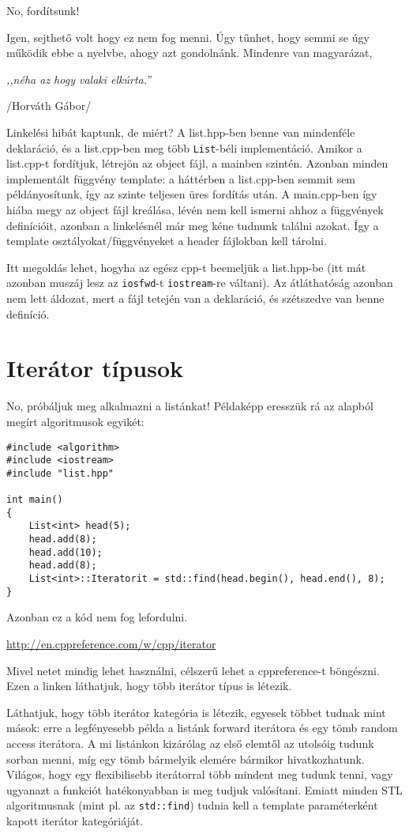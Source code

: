 \documentclass[a4paper,11.5pt]{article}
\begin{document}
	\medskip
	No, fordítsunk!
	
	\medskip
	Igen, sejthető volt hogy ez nem fog menni. Úgy tűnhet, hogy semmi se úgy működik ebbe a nyelvbe, ahogy azt gondolnánk. Mindenre van magyarázat,
	\begin{center}
		\textit{,,néha az hogy valaki elkúrta.''}
		
		/Horváth Gábor/
	\end{center}
	Linkelési hibát kaptunk, de miért? A list.hpp-ben benne van mindenféle deklaráció, és a list.cpp-ben meg több \texttt{List}-béli implementáció. Amikor a list.cpp-t fordítjuk, létrejön az object fájl, a mainben szintén. Azonban minden implementált függvény template: a háttérben a list.cpp-ben semmit sem példányosítunk, így az szinte teljesen üres fordítás után. A main.cpp-ben így hiába megy az object fájl kreálása, lévén nem kell ismerni ahhoz a függvények definícióit, azonban a linkelésnél már meg kéne tudnunk találni azokat. Így a template osztályokat/függvényeket a header fájlokban kell tárolni.
	
	Itt megoldás lehet, hogyha az egész cpp-t beemeljük a list.hpp-be (itt mát azonban muszáj lesz az \texttt{iosfwd}-t \texttt{iostream}-re váltani). Az átláthatóság azonban nem lett áldozat, mert a fájl tetején van a deklaráció, és szétszedve van benne definíció.
	\section{Iterátor típusok}
	No, próbáljuk meg alkalmazni a listánkat! Példaképp eresszük rá az alapból megírt algoritmusok egyikét:
\begin{lstlisting}
#include <algorithm>
#include <iostream>
#include "list.hpp"

int main()
{
	List<int> head(5);
	head.add(8);
	head.add(10);
	head.add(8);
	List<int>::Iteratorit = std::find(head.begin(), head.end(), 8);
}
\end{lstlisting}
	Azonban ez a kód nem fog lefordulni.
	
	\url{http://en.cppreference.com/w/cpp/iterator}
	
	Mivel netet mindig lehet használni, célszerű lehet a cppreference-t böngészni. Ezen a linken láthatjuk, hogy több iterátor típus is létezik.
	
	Láthatjuk, hogy több iterátor kategória is létezik, egyesek többet tudnak mint mások: erre a legfényesebb példa a listánk forward iterátora és egy tömb random access iterátora. A mi listánkon kizárólag az első elemtől az utolsóig tudunk sorban menni, míg egy tömb bármelyik elemére bármikor hivatkozhatunk. Világos, hogy egy flexibilisebb iterátorral több mindent meg tudunk tenni, vagy ugyanazt a funkciót hatékonyabban is meg tudjuk valósítani. Emiatt minden STL algoritmusnak (mint pl. az \texttt{std::find}) tudnia kell a template paraméterként kapott iterátor kategóriáját.
	
\end{document}
